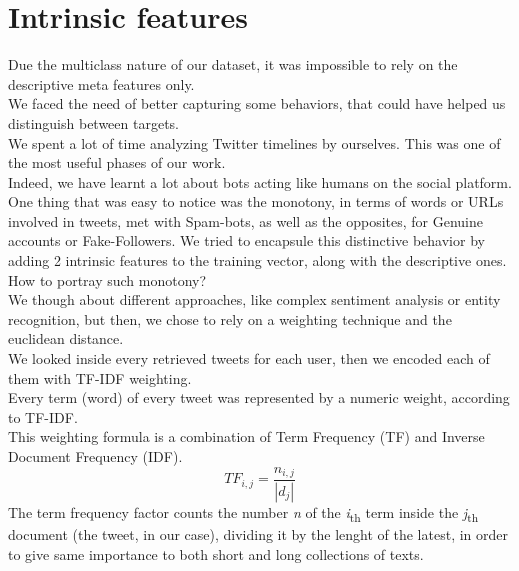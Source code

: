 \section{Intrinsic features}
Due the multiclass nature of our dataset, it was impossible to rely on the descriptive meta features only.\\
We faced the need of better capturing some behaviors, that could have helped us distinguish between targets.\\
We spent a lot of time analyzing Twitter timelines by ourselves. This was one of the most useful phases of our work.\\
Indeed, we have learnt a lot about bots acting like humans on the social platform.
One thing that was easy to notice was the monotony, in terms of words or URLs involved in tweets,  met with Spam-bots, as well as the opposites, for Genuine accounts or Fake-Followers.
We tried to encapsule this distinctive behavior by adding 2 intrinsic features to the training vector, along with the descriptive ones.\\
How to portray such monotony?\\
We though about different approaches, like complex sentiment analysis or entity recognition, but then, we chose to rely on a weighting technique and the euclidean distance.\\
We looked inside every retrieved tweets for each user, then we encoded each of them with TF-IDF weighting.\\
Every term (word) of every tweet was represented by a numeric weight, according to TF-IDF.\\
This weighting formula is a combination of Term Frequency (TF) and Inverse Document Frequency (IDF).
\[ TF_{i,j} =\frac {n_{i,j}}{|d_{j}|} \]
The term frequency factor counts the number \textit{n} of the \textit{i}\textsubscript{th} term inside the \textit{j}\textsubscript{th} document (the tweet, in our case), dividing it by the lenght of the latest, in order to give same importance to both short and long collections of texts.

